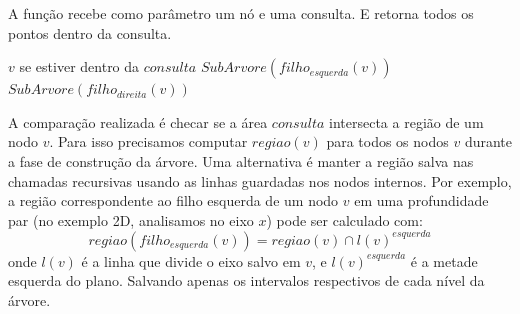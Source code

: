 \begin{algorithm}
    \caption{A função  recebe como parâmetro um nó e uma consulta. E retorna todos os pontos
     dentro da consulta.}
    \begin{algorithmic}[1]
        \Return  $v$ se estiver dentro da $consulta$
        \Else
            \State \Return $SubArvore( filho_{esquerda}(v) )$
            \Else
                \State {}
                \EndIf
            \EndIf
            \State \Return $SubArvore(filho_{direita}(v))$
            \Else
                \State {}
                \EndIf
            \EndIf
        \EndIf
    \EndFunction
    \end{algorithmic}
\end{algorithm}

A comparação realizada é checar se a área \(consulta\) intersecta a região
de um nodo \(v\). Para isso precisamos computar \(regiao(v)\) para todos os nodos \(v\)
durante a fase de construção da árvore.
Uma alternativa é manter a região salva nas chamadas recursivas usando as linhas guardadas
nos nodos internos. Por exemplo, a região correspondente ao filho esquerda de um nodo
\(v\) em uma profundidade par (no exemplo 2D, analisamos no eixo \(x\)) pode ser calculado com:
\[
    regiao(filho_{esquerda}(v)) = regiao(v) \cap l(v)^{esquerda}
\]
onde \(l(v)\) é a linha que divide o eixo salvo em \(v\), e \(l(v)^{esquerda}\) é a metade
esquerda do plano.
Salvando apenas os intervalos respectivos de cada nível da árvore. 

